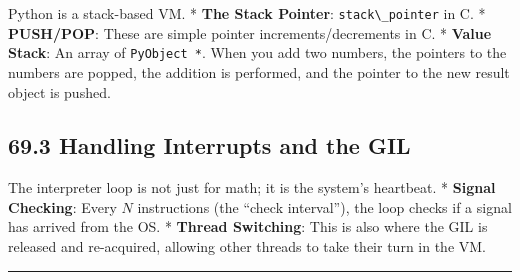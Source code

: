 Python is a stack-based VM. * \textbf{The Stack Pointer}:
\passthrough{\lstinline!stack\_pointer!} in C. * \textbf{PUSH/POP}:
These are simple pointer increments/decrements in C. * \textbf{Value
Stack}: An array of \passthrough{\lstinline!PyObject *!}. When you add
two numbers, the pointers to the numbers are popped, the addition is
performed, and the pointer to the new result object is pushed.

\hypertarget{handling-interrupts-and-the-gil}{%
\subsection{69.3 Handling Interrupts and the
GIL}\label{handling-interrupts-and-the-gil}}

The interpreter loop is not just for math; it is the system's heartbeat.
* \textbf{Signal Checking}: Every \(N\) instructions (the ``check
interval''), the loop checks if a signal has arrived from the OS. *
\textbf{Thread Switching}: This is also where the GIL is released and
re-acquired, allowing other threads to take their turn in the VM.

\begin{center}\rule{0.5\linewidth}{0.5pt}\end{center}
